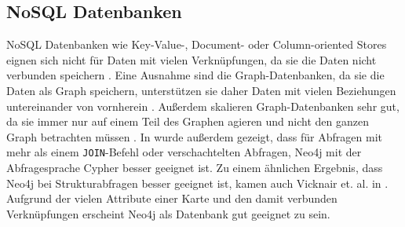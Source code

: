 \subsection{NoSQL Datenbanken}
\ac{NoSQL} Datenbanken wie Key-Value-, Document- oder Column-oriented Stores eignen sich nicht für Daten mit vielen Verknüpfungen, da sie die Daten nicht verbunden speichern \cite{robinsongraph:2015}. Eine Ausnahme sind die Graph-Datenbanken, da sie die Daten als Graph speichern, unterstützen sie daher Daten mit vielen Beziehungen untereinander von vornherein  \cite{robinsongraph:2015}. Außerdem skalieren Graph-Datenbanken sehr gut, da sie immer nur auf einem Teil des Graphen agieren und nicht den ganzen Graph betrachten müssen \cite{robinsongraph:2015}. In \cite{jaiswal2013comparative} wurde außerdem gezeigt, dass für Abfragen mit mehr als einem \verb|JOIN|-Befehl oder verschachtelten Abfragen, Neo4j mit der Abfragesprache Cypher besser geeignet ist. Zu einem ähnlichen Ergebnis, dass Neo4j bei Strukturabfragen besser geeignet ist, kamen auch Vicknair et. al. in \cite{vicknair2010comparison}. Aufgrund der vielen Attribute einer Karte und den damit verbunden Verknüpfungen erscheint Neo4j als Datenbank gut geeignet zu sein.